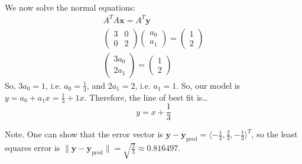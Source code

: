 \documentclass[12pt,letterpaper]{exam}
\begin{document}
\begin{questions}
{\[\begin{aligned}
	\end{aligned}
	\]
We now solve the normal equations:
	\[
	\begin{gathered}
	A^TA \mathbf{x}= A^T \mathbf{y} \\[0.2cm]
	\begin{pmatrix} 3 & 0 \\ 0 & 2 \end{pmatrix} \begin{pmatrix} a_0 \\ a_1 \end{pmatrix}= \begin{pmatrix} 1 \\ 2 \end{pmatrix} \\[0.2cm]
	\begin{pmatrix} 3a_0 \\ 2a_1 \end{pmatrix}= \begin{pmatrix} 1 \\ 2 \end{pmatrix}
	\end{gathered}
	\]
So, $3a_0= 1$, i.e. $a_0= \tfrac{1}{3}$, and $2a_1= 2$, i.e. $a_1= 1$. So, our model is $y= a_0 + a_1x= \tfrac{1}{3} + 1x$. Therefore, the line of best fit is\dots
	\[
	\boxed{y= x + \dfrac{1}{3}}
	\] \vfill

\tiny Note. One can show that the error vector is $\mathbf{y} - \mathbf{y}_{\text{pred}}= \langle -\tfrac{1}{3}, \tfrac{2}{3}, -\tfrac{1}{3} \rangle^T$, so the least squares error is $\| \mathbf{y} - \mathbf{y}_{\text{pred}} \|= \sqrt{\tfrac{2}{3}} \approx 0.816497$.}

\end{questions}
\end{document}
